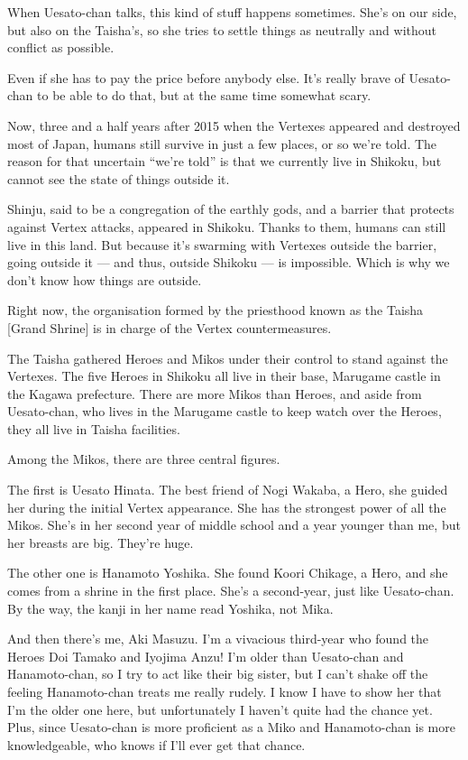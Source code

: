 When Uesato-chan talks, this kind of stuff happens sometimes. She's on our side, but also on the Taisha's, so she tries to settle things as neutrally and without conflict as possible.

Even if she has to pay the price before anybody else. It's really brave of Uesato-chan to be able to do that, but at the same time somewhat scary.

Now, three and a half years after 2015 when the Vertexes appeared and destroyed most of Japan, humans still survive in just a few places, or so we're told. The reason for that uncertain ``we're told'' is that we currently live in Shikoku, but cannot see the state of things outside it.

Shinju, said to be a congregation of the earthly gods, and a barrier that protects against Vertex attacks, appeared in Shikoku. Thanks to them, humans can still live in this land. But because it's swarming with Vertexes outside the barrier, going outside it --- and thus, outside Shikoku --- is impossible. Which is why we don't know how things are outside.

Right now, the organisation formed by the priesthood known as the Taisha [Grand Shrine] is in charge of the Vertex countermeasures.

The Taisha gathered Heroes and Mikos under their control to stand against the Vertexes. The five Heroes in Shikoku all live in their base, Marugame castle in the Kagawa prefecture. There are more Mikos than Heroes, and aside from Uesato-chan, who lives in the Marugame castle to keep watch over the Heroes, they all live in Taisha facilities.

Among the Mikos, there are three central figures.

The first is Uesato Hinata. The best friend of Nogi Wakaba, a Hero, she guided her during the initial Vertex appearance. She has the strongest power of all the Mikos. She's in her second year of middle school and a year younger than me, but her breasts are big. They're huge.

The other one is Hanamoto Yoshika. She found Koori Chikage, a Hero, and she comes from a shrine in the first place. She's a second-year, just like Uesato-chan. By the way, the kanji in her name read Yoshika, not Mika.

And then there's me, Aki Masuzu. I'm a vivacious third-year who found the Heroes Doi Tamako and Iyojima Anzu! I'm older than Uesato-chan and Hanamoto-chan, so I try to act like their big sister, but I can't shake off the feeling Hanamoto-chan treats me really rudely. I know I have to show her that I'm the older one here, but unfortunately I haven't quite had the chance yet. Plus, since Uesato-chan is more proficient as a Miko and Hanamoto-chan is more knowledgeable, who knows if I'll ever get that chance.

